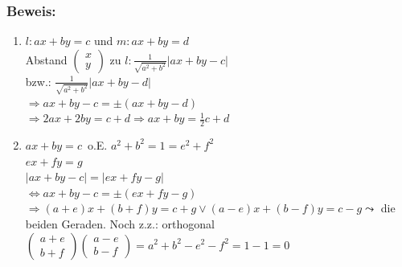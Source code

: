 \subsubsection{Beweis:}
\begin{enumerate}
	\item $l:ax+by=c $ und $  m:ax+by=d$\\
	Abstand $\begin{pmatrix} x \\ y\end{pmatrix}$ zu $l: \frac{1}{\sqrt{a^{2}+b^{2}}} |
	ax+by-c|$\\
	bzw.: $\frac{1}{\sqrt{a^{2}+b^{2}}}|ax+by-d|$\\
	$\Rightarrow ax+by-c=\pm(ax+by-d)$\\
	$\Rightarrow 2ax+2by=c+d \Rightarrow ax+by=\frac{1}{2} c+d$
	\item $ax+by=c \,$ o.E. $a^{2}+b^{2}=1=e^{2}+f^{2}$\\
	$ex+fy=g$\\
	$|ax+by-c|=|ex+fy-g|$\\
	$\Leftrightarrow ax+by-c=\pm(ex+fy-g)$\\
	$\Rightarrow (a+e)x+(b+f)y=c+g \vee (a-e)x+(b-f)y=c-g \leadsto$ die beiden 
	Geraden. Noch z.z.: orthogonal\\
	$\begin{pmatrix} a+e \\ b+f \end{pmatrix} \begin{pmatrix} a-e \\ b-f \end{pmatrix} = 
	a^{2}+b^{2}-e^{2}-f^{2}=1-1=0$
\end{enumerate}